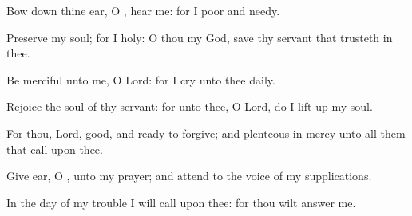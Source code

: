 {\Q {}Bow
down thine
ear, O
{},
hear me: for I
{}
poor and
needy.


\par }{\Q {}Preserve my
soul; for I
{}
holy: O thou my
God,
save thy
servant that
trusteth in thee.


\par }{\Q {}Be
merciful unto me, O
Lord: for I
cry unto thee
daily.


\par }{\Q {}Rejoice the
soul of thy
servant: for unto thee, O
Lord, do I lift
up my
soul.


\par }{\Q {}For thou,
Lord,
{}
good, and ready to
forgive; and
plenteous in
mercy unto all them that
call upon thee.


\par }{\Q {}Give
ear, O
{}, unto my
prayer; and
attend to the
voice of my
supplications.


\par }{\Q {}In the
day of my
trouble I will
call upon thee: for thou wilt
answer me.


\par }{\BB \par }
